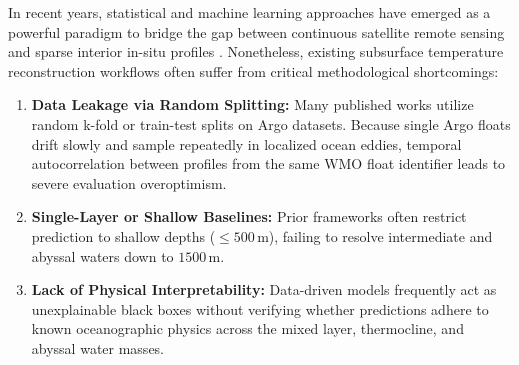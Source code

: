 \documentclass[conference]{IEEEtran}
\begin{document}
In recent years, statistical and machine learning approaches have emerged as a powerful paradigm to bridge the gap between continuous satellite remote sensing and sparse interior in-situ profiles \cite{ali2004predicting, su2018reconstructing, zhang2022physics}. Nonetheless, existing subsurface temperature reconstruction workflows often suffer from critical methodological shortcomings:
\begin{enumerate}
    \item \textbf{Data Leakage via Random Splitting:} Many published works utilize random k-fold or train-test splits on Argo datasets. Because single Argo floats drift slowly and sample repeatedly in localized ocean eddies, temporal autocorrelation between profiles from the same WMO float identifier leads to severe evaluation overoptimism.
    \item \textbf{Single-Layer or Shallow Baselines:} Prior frameworks often restrict prediction to shallow depths ($\le 500\,\text{m}$), failing to resolve intermediate and abyssal waters down to $1500\,\text{m}$.
    \item \textbf{Lack of Physical Interpretability:} Data-driven models frequently act as unexplainable black boxes without verifying whether predictions adhere to known oceanographic physics across the mixed layer, thermocline, and abyssal water masses.
\end{enumerate}
\end{document}
